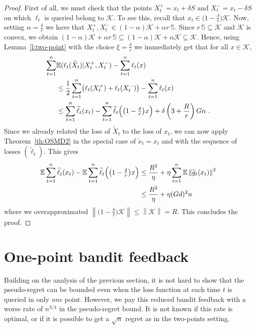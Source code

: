 \documentclass[11pt]{hackednow}
\newcommand{\E}{\mathbb{E}}
\newcommand{\cK}{\mathcal{K}}
\renewcommand{\tilde}{\widetilde}
\newcommand{\Sphere}{\mathbb{S}}
\newcommand{\norm}[1]{\left\|{#1}\right\|}
\newcommand{\tX}{\widetilde{X}}
\newcommand{\tloss}{\widetilde{\ell}}
\newcommand{\gtilde}{\widetilde{g}}
\begin{document}
\begin{proof}
First of all, we must check that the points $X_t^+ = x_t + \delta S$ and $X_t^- = x_t - \delta S$ on which $\ell_t$ is queried belong to $\cK$. To see this, recall that $x_t\in \bigl(1-\tfrac{\delta}{r}\bigr)\cK$. Now, setting $\alpha = \tfrac{\delta}{r}$ we have that $X_t^+,X_t^- \in (1-\alpha)\cK + \alpha r\,\Sphere$. Since $r\,\Sphere \subseteq \cK$ and $\cK$ is convex, we obtain $(1-\alpha)\cK + \alpha r\,\Sphere \subseteq (1-\alpha)\cK + \alpha\cK \subseteq \cK$. Hence, using Lemma~\ref{l:two-point} with the choice $\xi = \tfrac{\delta}{r}$ we immediately get that for all $x\in\cK$,
\begin{align*}
    \sum_{t=1}^n & \E( \ell_t(\tX_t) | X_t^+, X_t^-) - \sum_{t=1}^n \ell_t(x)
\\& \le
    \frac{1}{2}\sum_{t=1}^n \bigl(\ell_t(X_t^+) + \ell_t(X_t^-)\bigr) - \sum_{t=1}^n \ell_t(x)
\\& \le
    \sum_{t=1}^n \tloss_t(x_t) - \sum_{t=1}^n \tloss_t\Bigl(\bigl(1-\tfrac{\delta}{r}\bigr)x\Bigr) + \delta\left(3 + \frac{R}{r} \right) G n~.
\end{align*}
Since we already related the loss of $\tX_t$ to the loss of $x_t$, we can now apply Theorem~\ref{th:OSMD2} in the special case of $\tilde{x}_t = x_t$ and with the sequence of losses $(\tloss_t)$. This gives
\begin{align*}
    \E \sum_{t=1}^n \tloss_t(x_t) - \E \sum_{t=1}^n \tloss_t\Bigl(\bigl(1-\tfrac{\delta}{r}\bigr)x\Bigr)
& \le
    \frac{R^2}{\eta} + \eta\sum_{t=1}^n \E \norm{\gtilde_t(x_t)}^2
\\& \le
    \frac{R^2}{\eta} + \eta (Gd)^2 n
\end{align*}
where we overapproximated $\norm{\bigl(1-\tfrac{\delta}{r}\bigr)\cK} \le \norm{\cK} = R$. This concludes the proof.
\end{proof}


\section{One-point bandit feedback}
%
Building on the analysis of the previous section, it is not hard to show that the pseudo-regret can be bounded even when the loss function at each time $t$ is queried in only \textsl{one} point. However, we pay this reduced bandit feedback with a worse rate of $n^{3/4}$ in the pseudo-regret bound. It is not known if this rate is optimal, or if it is possible to get a $\sqrt{n}$ regret as in the two-points setting.
\end{document}
